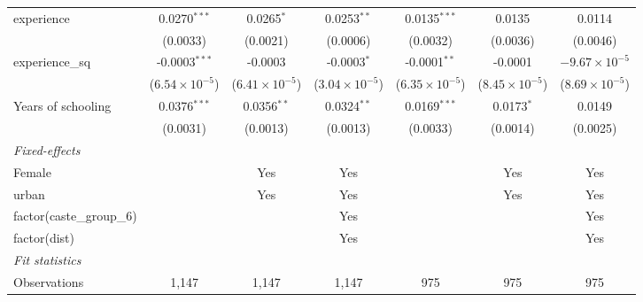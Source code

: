 \begin{table}[htbp]
\begin{adjustbox}{width = \textwidth, center}
\begin{tabular}{lcccccc}
         experience                & 0.0270$^{***}$          & 0.0265$^{*}$            & 0.0253$^{**}$           & 0.0135$^{***}$          & 0.0135                  & 0.0114\\   
                                   & (0.0033)                & (0.0021)                & (0.0006)                & (0.0032)                & (0.0036)                & (0.0046)\\   
         experience\_sq            & -0.0003$^{***}$         & -0.0003                 & -0.0003$^{*}$           & -0.0001$^{**}$          & -0.0001                 & $-9.67\times 10^{-5}$\\    
                                   & ($6.54\times 10^{-5}$)  & ($6.41\times 10^{-5}$)  & ($3.04\times 10^{-5}$)  & ($6.35\times 10^{-5}$)  & ($8.45\times 10^{-5}$)  & ($8.69\times 10^{-5}$)\\    
         Years of schooling        & 0.0376$^{***}$          & 0.0356$^{**}$           & 0.0324$^{**}$           & 0.0169$^{***}$          & 0.0173$^{*}$            & 0.0149\\   
                                   & (0.0031)                & (0.0013)                & (0.0013)                & (0.0033)                & (0.0014)                & (0.0025)\\   
         \midrule
         \emph{Fixed-effects}\\
         Female                    &                         & Yes                     & Yes                     &                         & Yes                     & Yes\\  
         urban                     &                         & Yes                     & Yes                     &                         & Yes                     & Yes\\  
         factor(caste\_group\_6)   &                         &                         & Yes                     &                         &                         & Yes\\  
         factor(dist)              &                         &                         & Yes                     &                         &                         & Yes\\  
         \midrule
         \emph{Fit statistics}\\
         Observations              & 1,147                   & 1,147                   & 1,147                   & 975                     & 975                     & 975\\  

\end{tabular}
\end{adjustbox}
\end{table}
